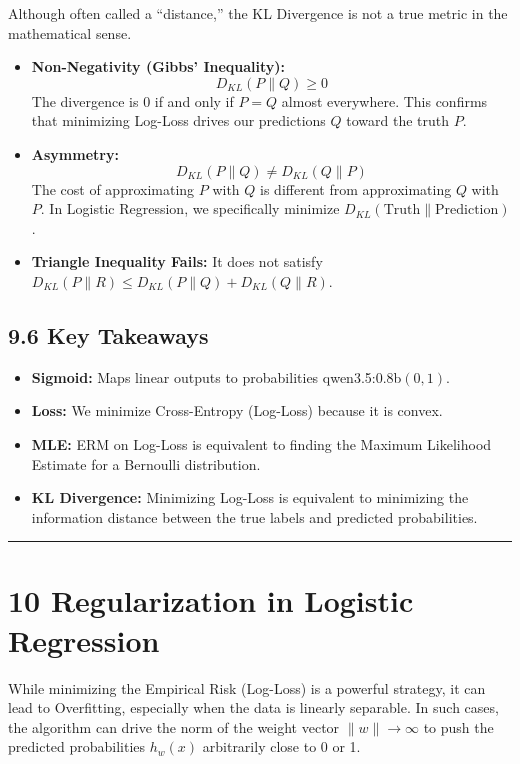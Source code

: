 \documentclass[
  italian,
  11pt,
]{article}
\providecommand{\tightlist}{%
  \setlength{\itemsep}{0pt}\setlength{\parskip}{0pt}}
\begin{document}
Although often called a ``distance,'' the KL Divergence is not a true
metric in the mathematical sense.

\begin{itemize}
\tightlist
\item
  \textbf{Non-Negativity (Gibbs' Inequality):} \[D_{KL}(P \| Q) \ge 0\]
  The divergence is \(0\) if and only if \(P = Q\) almost everywhere.
  This confirms that minimizing Log-Loss drives our predictions \(Q\)
  toward the truth \(P\).
\item
  \textbf{Asymmetry:} \[D_{KL}(P \| Q) \neq D_{KL}(Q \| P)\] The cost of
  approximating \(P\) with \(Q\) is different from approximating \(Q\)
  with \(P\). In Logistic Regression, we specifically minimize
  \(D_{KL}(\text{Truth} \| \text{Prediction})\).
\item
  \textbf{Triangle Inequality Fails:} It does not satisfy
  \(D_{KL}(P \| R) \le D_{KL}(P \| Q) + D_{KL}(Q \| R)\).
\end{itemize}

\subsection{9.6 Key Takeaways}\label{key-takeaways-8}

\begin{itemize}
\tightlist
\item
  \textbf{Sigmoid:} Maps linear outputs to probabilities
  qwen3.5:0.8b\((0, 1)\).
\item
  \textbf{Loss:} We minimize Cross-Entropy (Log-Loss) because it is
  convex.
\item
  \textbf{MLE:} ERM on Log-Loss is equivalent to finding the Maximum
  Likelihood Estimate for a Bernoulli distribution.
\item
  \textbf{KL Divergence:} Minimizing Log-Loss is equivalent to
  minimizing the information distance between the true labels and
  predicted probabilities.
\end{itemize}

\begin{center}\rule{0.5\linewidth}{0.5pt}\end{center}

\section{10 Regularization in Logistic
Regression}\label{regularization-in-logistic-regression}

While minimizing the Empirical Risk (Log-Loss) is a powerful strategy,
it can lead to Overfitting, especially when the data is linearly
separable. In such cases, the algorithm can drive the norm of the weight
vector \(\|w\| \to \infty\) to push the predicted probabilities
\(h_w(x)\) arbitrarily close to 0 or 1.
\end{document}
